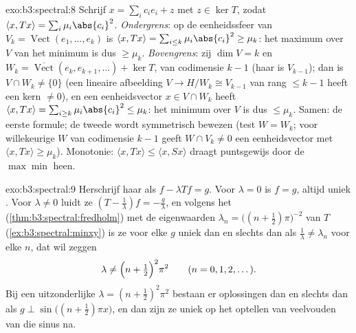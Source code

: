 \begin{solution}{exo:b3:spectral:8}
Schrijf $x = \sum_ic_ie_i + z$ met $z \in \ker T$, zodat $\langle
x, Tx\rangle = \sum_i\mu_i\abs{c_i}^2$. \emph{Ondergrens}: op de
eenheidssfeer van $V_k = \operatorname{Vect}(e_1, \dots, e_k)$ is
$\langle x, Tx\rangle = \sum_{i\leq k}\mu_i\abs{c_i}^2 \geq
\mu_k$: het maximum over $V$ van het minimum is dus $\geq \mu_k$.
\emph{Bovengrens}: zij $\dim V = k$ en $W_k =
\overline{\operatorname{Vect}}(e_k, e_{k+1}, \dots) + \ker T$,
van codimensie $k - 1$ (haar  is
$V_{k-1}$); dan is $V \cap W_k \neq \{0\}$ (een lineaire
afbeelding $V \to H/W_k \cong V_{k-1}$ van rang $\leq k - 1$
heeft een kern $\neq 0$), en een eenheidsvector $x \in V\cap W_k$
heeft $\langle x, Tx\rangle = \sum_{i \geq k}\mu_i\abs{c_i}^2
\leq \mu_k$: het minimum over $V$ is dus $\leq \mu_k$. Samen: de
eerste formule; de tweede wordt symmetrisch bewezen (test $W =
W_k$; voor willekeurige $W$ van codimensie $k-1$ geeft $W \cap
V_k \neq 0$ een eenheidsvector met $\langle x, Tx\rangle \geq
\mu_k$). Monotonie: $\langle x, Tx\rangle \leq \langle x,
Sx\rangle$ draagt puntsgewijs door de $\max\min$ heen.
\end{solution}

\begin{solution}{exo:b3:spectral:9}
Herschrijf haar als $f - \lambda Tf = g$. Voor $\lambda = 0$ is
$f = g$, altijd uniek . Voor $\lambda \neq 0$ luidt ze
$(T - \frac1\lambda)f = -\frac g\lambda$, en volgens het
 (\cref{thm:b3:spectral:fredholm}) met de
eigenwaarden $\lambda_n = \bigl((n + \frac12)\pi\bigr)^{-2}$ van
$T$ (\cref{ex:b3:spectral:minxy}) is ze voor elke $g$ uniek
 dan en slechts dan als $\frac1\lambda \neq \lambda_n$
voor elke $n$, dat wil zeggen
\[
\lambda \neq \Bigl(n + \tfrac12\Bigr)^2\pi^2
\qquad (n = 0, 1, 2, \dots).
\]
Bij een uitzonderlijke $\lambda = (n+\frac12)^2\pi^2$ bestaan er
oplossingen dan en slechts dan als $g \perp
\sin\bigl((n{+}\frac12)\pi x\bigr)$, en dan zijn ze uniek op het
optellen van veelvouden van die sinus na.
\end{solution}

